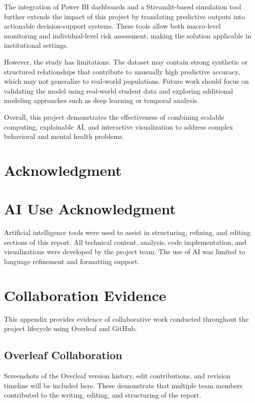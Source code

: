 \documentclass[conference]{IEEEtran}
\begin{document}
The integration of Power BI dashboards and a Streamlit-based simulation tool further extends the impact of this project by translating predictive outputs into actionable decision-support systems. These tools allow both macro-level monitoring and individual-level risk assessment, making the solution applicable in institutional settings.

However, the study has limitations. The dataset may contain strong synthetic or structured relationships that contribute to unusually high predictive accuracy, which may not generalize to real-world populations. Future work should focus on validating the model using real-world student data and exploring additional modeling approaches such as deep learning or temporal analysis.

Overall, this project demonstrates the effectiveness of combining scalable computing, explainable AI, and interactive visualization to address complex behavioral and mental health problems.

\section*{Acknowledgment}

\section*{AI Use Acknowledgment}

Artificial intelligence tools were used to assist in structuring, refining, and editing sections of this report. All technical content, analysis, code implementation, and visualizations were developed by the project team. The use of AI was limited to language refinement and formatting support.

\appendices
\section{Collaboration Evidence}

This appendix provides evidence of collaborative work conducted throughout the project lifecycle using Overleaf and GitHub.

\subsection{Overleaf Collaboration}

Screenshots of the Overleaf version history, edit contributions, and revision timeline will be included here. These demonstrate that multiple team members contributed to the writing, editing, and structuring of the report.
\end{document}
